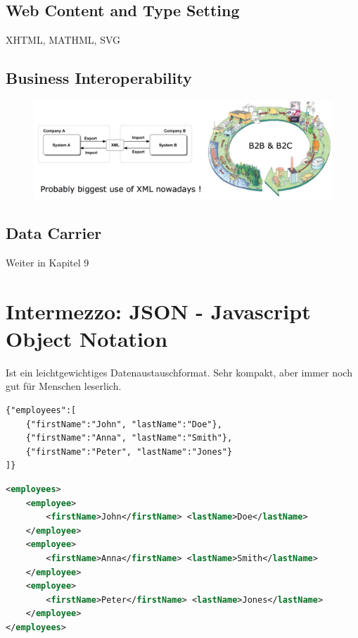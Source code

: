 \subsection{Web Content and Type Setting}
XHTML, MATHML, SVG

\subsection{Business Interoperability}
\begin{figure}[h!]
\includegraphics[width=\textwidth]{fig/Businessinteroperability.png}
\end{figure}

\subsection{Data Carrier}
Weiter in Kapitel 9

\section{Intermezzo: JSON - Javascript Object Notation}
Ist ein leichtgewichtiges Datenaustauschformat. Sehr kompakt, aber immer noch gut für Menschen leserlich.

\begin{minipage}{0.45\textwidth}
\begin{lstlisting}[language=XML, caption={JSON Example}]
{"employees":[
    {"firstName":"John", "lastName":"Doe"},
    {"firstName":"Anna", "lastName":"Smith"},
    {"firstName":"Peter", "lastName":"Jones"}
]}
\end{lstlisting}
\end{minipage}
\hfill
\begin{minipage}{0.45\textwidth}
\begin{lstlisting}[language=XML, caption={XML Example}]
<employees>
    <employee>
        <firstName>John</firstName> <lastName>Doe</lastName>
    </employee>
    <employee>
        <firstName>Anna</firstName> <lastName>Smith</lastName>
    </employee>
    <employee>
        <firstName>Peter</firstName> <lastName>Jones</lastName>
    </employee>
</employees>
\end{lstlisting}
\end{minipage}\\

